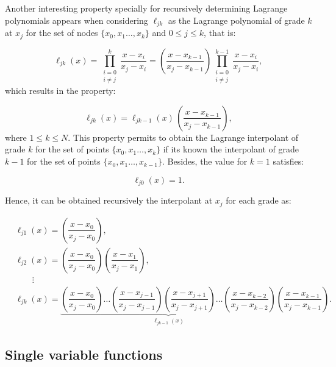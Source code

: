     Another interesting property specially for recursively determining Lagrange polynomials appears when considering   $\ell_{jk}$ as the Lagrange polynomial of grade $k$ at $x_j$ for the set of nodes $\{x_0,x_1\ldots,x_k\}$ and $0 \leq j\leq k$, that is:
    
    \begin{equation}
     \ell_{jk}(x) = \prod_{\substack{i=0 \\ i\neq j}}^{k} \dfrac{x - x_i}{x_j - x_i} = \left(\dfrac{x - x_{k-1}}{x_j - x_{k-1}}\right) \prod_{\substack{i=0 \\ i\neq j}}^{k-1} \dfrac{x - x_i}{x_j - x_i},
    \end{equation}
     which results in the property:
     
     \begin{equation}
     \ell_{jk}(x) = \ell_{jk-1}(x) \, \left(\dfrac{x - x_{k-1}}{x_j - x_{k-1}}\right),
     \end{equation}
     where $1\leq k \leq N$. This property permits to obtain the Lagrange interpolant of grade $k$ for the set of points $\{x_0,x_1\ldots,x_k\}$ if its known the interpolant of grade $k-1$ for the set of points $\{x_0,x_1\ldots,x_{k-1}\}$. Besides, the value for $k=1$ satisfies:
     
     \begin{equation}
     	\ell_{j0}(x) = 1.
     \end{equation}
     
     Hence, it can be obtained recursively the interpolant at $x_j$ for each grade as:
     
     \begin{align*}
     	& \ell_{j1}(x) = \left(\dfrac{x - x_{0}}{x_j - x_{0}}\right), \\
     	& \ell_{j2}(x) = \left(\dfrac{x - x_{0}}{x_j - x_{0}}\right) \left(\dfrac{x - x_{1}}{x_j - x_{1}}\right), \\ 
     	& \qquad \vdots \\
     	& \ell_{jk}(x) = \underbrace{\left(\dfrac{x - x_{0}}{x_j - x_{0}}\right)  \ldots 
     	\left(\dfrac{x - x_{j-1}}{x_j - x_{j-1}}\right) \left(\dfrac{x - x_{j+1}}{x_j - x_{j+1}}\right) \ldots 
     	\left(\dfrac{x - x_{k-2}}{x_j - x_{k-2}}\right)}_{\ell_{jk-1}(x)} \left(\dfrac{x - x_{k-1}}{x_j - x_{k-1}}\right) . 
     \end{align*}
    \subsection{Single variable functions}
    
